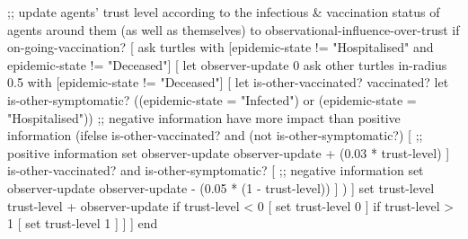 \begin{algorithm}[language=NetLogo, caption={Observational influence over trust}, label={algo:observational}]
;; update agents' trust level according to the infectious & vaccination status of agents around them (as well as themselves)
to observational-influence-over-trust
  if on-going-vaccination?
  [
    ask turtles with [epidemic-state != "Hospitalised" and epidemic-state != "Deceased"] [
      let observer-update 0
      ask other turtles in-radius 0.5 with [epidemic-state != "Deceased"] [
        let is-other-vaccinated? vaccinated?
        let is-other-symptomatic? ((epidemic-state = "Infected") or (epidemic-state = "Hospitalised"))
        ;; negative information have more impact than positive information
        (ifelse
          is-other-vaccinated? and (not is-other-symptomatic?)
          [
            ;; positive information
            set observer-update observer-update + (0.03 * trust-level)
          ]
          is-other-vaccinated? and is-other-symptomatic?
          [
            ;; negative information
            set observer-update observer-update - (0.05 * (1 - trust-level))
          ]
        )
      ]
      set trust-level trust-level + observer-update
      if trust-level < 0 [ set trust-level 0 ]
      if trust-level > 1 [ set trust-level 1 ]
    ]
  ]
end
\end{algorithm}

\newpage

